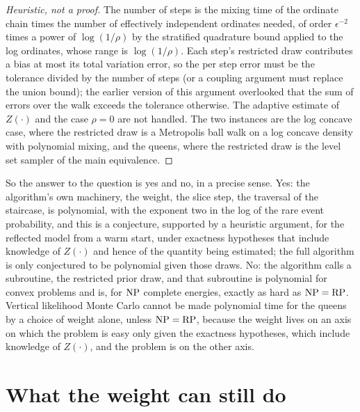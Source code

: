 \begin{proof}[Heuristic, not a proof]
The number of steps is the mixing time of the ordinate chain times the number of effectively independent ordinates needed, of order $\epsilon^{-2}$ times a power of $\log(1/\rho)$ by the stratified quadrature bound applied to the log ordinates, whose range is $\log(1/\rho)$. Each step's restricted draw contributes a bias at most its total variation error, so the per step error must be the tolerance divided by the number of steps (or a coupling argument must replace the union bound); the earlier version of this argument overlooked that the sum of errors over the walk exceeds the tolerance otherwise. The adaptive estimate of $Z(\cdot)$ and the case $\rho = 0$ are not handled. The two instances are the log concave case, where the restricted draw is a Metropolis ball walk on a log concave density with polynomial mixing, and the queens, where the restricted draw is the level set sampler of the main equivalence.
\end{proof}

So the answer to the question is yes and no, in a precise sense. Yes: the algorithm's own machinery, the weight, the slice step, the traversal of the staircase, is polynomial, with the exponent two in the log of the rare event probability, and this is a conjecture, supported by a heuristic argument, for the reflected model from a warm start, under exactness hypotheses that include knowledge of $Z(\cdot)$ and hence of the quantity being estimated; the full algorithm is only conjectured to be polynomial given those draws. No: the algorithm calls a subroutine, the restricted prior draw, and that subroutine is polynomial for convex problems and is, for $\mathrm{NP}$ complete energies, exactly as hard as $\mathrm{NP} = \mathrm{RP}$. Vertical likelihood Monte Carlo cannot be made polynomial time for the queens by a choice of weight alone, unless $\mathrm{NP} = \mathrm{RP}$, because the weight lives on an axis on which the problem is easy only given the exactness hypotheses, which include knowledge of $Z(\cdot)$, and the problem is on the other axis.

\section{What the weight can still do}

